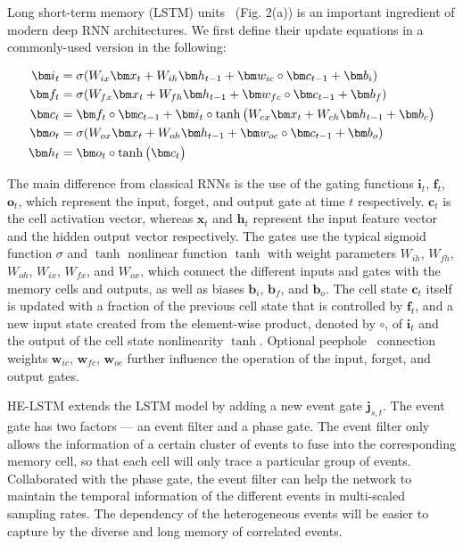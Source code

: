 \documentclass[letterpaper]{article} %
\begin{document}
Long short-term memory (LSTM) units~\cite{hochreiter1997long} (Fig. 2(a)) is an important ingredient of modern deep
RNN architectures. We first define their update equations in a commonly-used version in the following:

\begin{align}\label{grubegin}
\setlength{\abovedisplayskip}{3pt}
\bm i_t &= \sigma(W_{ix}\bm x_t+ W_{ih}\bm h_{t-1} + \bm w_{ic} \circ \bm c_{t-1}+ \bm b_i)\\
\bm f_t &= \sigma(W_{fx}\bm x_t+ W_{fh}\bm h_{t-1} + \bm w_{fc} \circ \bm c_{t-1} + \bm b_f)\\
\bm c_t &= \bm f_t \circ \bm c_{t-1} + \bm i_t \circ \tanh\big (W_{cx}\bm x_t+ W_{ch} \bm h_{t-1} + \bm b_c \big) \\
\bm o_t &= \sigma(W_{ox}\bm x_t+ W_{oh}\bm h_{t-1} + \bm w_{oc} \circ \bm c_{t-1} + \bm b_o)\\
\bm h_t &= \bm o_t \circ \tanh \big( \bm c_t \big)
\label{gruend}
\setlength{\belowdisplayskip}{3pt}
\end{align}

The main difference from classical RNNs is the use of the gating functions $\bm i_t$, $\bm f_t$, $\bm o_t$, which represent
the input, forget, and output gate at time $t$ respectively. $\bm c_t$ is the cell activation vector, whereas $\bm x_t$
and $\bm h_t$ represent the input feature vector and the hidden output vector respectively.
The gates use the
typical sigmoid function $\sigma $ and $\tanh$ nonlinear function $\tanh$ with weight parameters
$W_{ih}$, $W_{fh}$, $W_{oh}$, $W_{ix}$, $W_{fx}$, and $W_{ox}$, which connect the different inputs and gates with the memory
cells and outputs, as well as biases $\bm b_i$, $\bm b_f$, and $\bm b_o$. The cell state $\bm c_t$ itself is updated with a fraction of the previous cell state that is controlled by $\bm f_t$, and a new input state created from the element-wise product, denoted by $\circ$, of $\bm i_t$ and the output of the cell state nonlinearity $\tanh$. Optional peephole~\cite{gers2000recurrent} connection weights $\bm w_{ic}$, $\bm w_{fc}$, $\bm w_{oc}$ further influence the operation of the input, forget,
and output gates.

HE-LSTM extends the LSTM model by adding a new event gate $\bm j_{s,t}$.
 The event gate has two factors --- an event filter and a phase gate. The event filter only allows the information of a certain cluster of events to fuse into the corresponding memory cell, so that each cell will only trace a particular group of events. Collaborated with the phase gate, the event filter can help the network to maintain the temporal information of the different events in multi-scaled sampling rates. The dependency of the heterogeneous events will be easier to capture by the diverse and long memory of correlated events.
\end{document}
